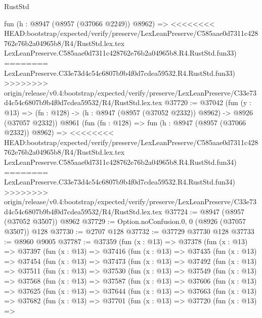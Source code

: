 \begin{lexlean}{RustStd}
\begin{coremodule}
{\begin{coremodule}
{{{{{{{{{{{{{{{{{{{{{{{{{{{{{{{{{{{{{{{    fun (h : @8947 (@8957 (@37066 @2249)) @8962) =>
<<<<<<<< HEAD:bootstrap/expected/verify/preserve/LexLeanPreserve/C585aae0d7311c428762e76b2a04965b8/R4/RustStd.lex.tex
    LexLeanPreserve.C585aae0d7311c428762e76b2a04965b8.R4.RustStd.fun33)
========
    LexLeanPreserve.C33e73d4c54c6807b9b4f0d7cdea59532.R4.RustStd.fun33)
>>>>>>>> origin/release/v0.4:bootstrap/expected/verify/preserve/LexLeanPreserve/C33e73d4c54c6807b9b4f0d7cdea59532/R4/RustStd.lex.tex
@37720 := @37042
    (fun (y : @13) =>
    (fn : @128) -> (h : @8947 (@8957 (@37052 @2332)) @8962) -> @8926 (@37057 @2332))
    @8961
    (fun (fn : @128) =>
    fun (h : @8947 (@8957 (@37066 @2332)) @8962) =>
<<<<<<<< HEAD:bootstrap/expected/verify/preserve/LexLeanPreserve/C585aae0d7311c428762e76b2a04965b8/R4/RustStd.lex.tex
    LexLeanPreserve.C585aae0d7311c428762e76b2a04965b8.R4.RustStd.fun34)
========
    LexLeanPreserve.C33e73d4c54c6807b9b4f0d7cdea59532.R4.RustStd.fun34)
>>>>>>>> origin/release/v0.4:bootstrap/expected/verify/preserve/LexLeanPreserve/C33e73d4c54c6807b9b4f0d7cdea59532/R4/RustStd.lex.tex
@37724 := @8947 (@8957 (@37052 @3507)) @8962
@37729 := Option.noConfusion.{0, 0} (@8926 (@37057 @3507)) @128
@37730 := @2707 @128
@37732 := @37729 @37730 @128
@37733 := @8960 @9005
@37787 := @37359
    (fun (x : @13) =>
    @37378
      (fun (x : @13) =>
      @37397
        (fun (x : @13) =>
        @37416
          (fun (x : @13) =>
          @37435
            (fun (x : @13) =>
            @37454
              (fun (x : @13) =>
              @37473
                (fun (x : @13) =>
                @37492
                  (fun (x : @13) =>
                  @37511
                    (fun (x : @13) =>
                    @37530
                      (fun (x : @13) =>
                      @37549
                        (fun (x : @13) =>
                        @37568
                          (fun (x : @13) =>
                          @37587
                            (fun (x : @13) =>
                            @37606
                              (fun (x : @13) =>
                              @37625
                                (fun (x : @13) =>
                                @37644
                                  (fun (x : @13) =>
                                  @37663
                                    (fun (x : @13) =>
                                    @37682
                                      (fun (x : @13) =>
                                      @37701
                                        (fun (x : @13) =>
                                        @37720
                                          (fun (x : @13) =>
}}}}}}}}}}}}}}}}}}}}}}}}}}}}}}}}}}}}}}}
\end{coremodule}}
\end{coremodule}
\end{lexlean}
